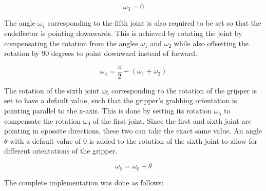 $$\omega_3 = 0$$

The angle $\omega_4$ corresponding to the fifth joint is also required to be set so that the endeffector is pointing downwards. This is achieved by rotating the joint by compensating the rotation from the angles $\omega_1$ and $\omega_2$ while also offsetting the rotation by 90 degrees to point downward instead of forward.

$$\omega_4 = \frac{\pi}{2} - (\omega_1 + \omega_2)$$

The rotation of the sixth joint $\omega_5$ corresponding to the rotation of the gripper is set to have a default value, such that the gripper's grabbing orientation is pointing parallel to the x-axis. This is done by setting its rotation $\omega_5$ to compensate the rotation $\omega_0$ of the first joint. Since the first and sixth joint are pointing in opossite directions, these two can take the exact same value. An angle $\theta$ with a default value of $0$ is added to the rotation of the sixth joint to allow for different orientations of the gripper.

$$\omega_5 = \omega_0 + \theta$$


The complete implementation was done as follows:

